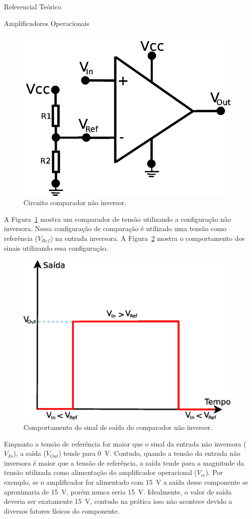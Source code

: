 \begin{chapter}{Referencial Teórico}
\begin{section}{Amplificadores Operacionais}
\begin{figure}[!h]
	\centering
	\begin{minipage}[c]{\textwidth}
	\centering
	\includegraphics[width=0.6\linewidth]{fig/nao_inversor}
	\caption{Circuito comparador não inversor.}
	\label{fig:comparador1}
	\end{minipage}
\end{figure}

A Figura~\ref{fig:comparador1} mostra um comparador de tensão utilizando a
configuração não inversora. Nessa configuração de comparação é utilizado uma
tensão como referência ($V_{Ref}$) na entrada inversora. A
Figura~\ref{fig:sinal1} mostra o comportamento dos sinais utilizando essa
configuração.

\begin{figure}[!h]
	\centering
	\begin{minipage}[c]{\textwidth}
	\centering
	\includegraphics[width=0.5\linewidth]{fig/comparador_nao_inversor}
	\caption{Comportamento do sinal de saída do comparador não inversor.}
	\label{fig:sinal1}
	\end{minipage}
\end{figure}

Enquanto a tensão de referência for maior que o sinal da entrada não inversora
($V_{In}$), a saída ($V_{Out}$) tende para 0~V. Contudo, quando a tensão da
entrada não inversora é maior que a tensão de referência, a saída  tende para a
magnitude da tensão utilizada como alimentação do amplificador operacional
($V_{cc}$). Por exemplo, se o amplificador for alimentado com 15~V a saída desse
componente se aproximaria de 15~V, porém nunca seria 15~V. Idealmente, o valor
de saída deveria ser exatamente 15~V, contudo na prática isso não
acontece devido a diversos fatores físicos do componente.


\end{section}
\end{chapter}
